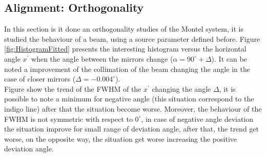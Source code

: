 \subsection{Alignment: Orthogonality}
In this section is it done an orthogonality studies of the Montel system, it is studied the behaviour of a beam, using a source parameter defined before. Figure \ref{fig:HistogramFitted} presents the interesting histogram versus the horizontal angle $x^{'} $ when the angle between the mirrors change ($\alpha = 90^{\circ} + \Delta $). It can be noted a improvement of the collimation of the beam changing the angle in the case of closer mirrors ($\Delta = -0.004^{\circ} $).
\\
Figure show the trend of the FWHM of the $x^{'} $ changing the angle $\Delta $, it is possible to note a minimum for negative angle (this  situation correspond to the indigo line) after that the situation become worse. Moreover, the behaviour of the FWHM is not symmetric with respect to $0^{\circ} $, in case of negative angle deviation the situation improve for small range of deviation angle, after that, the trend get worse, on the opposite way, the situation get worse increasing the positive deviation angle. 
%
%
%
%
%
%
